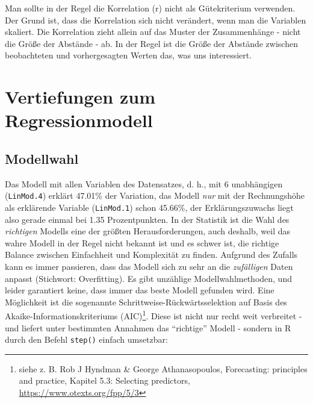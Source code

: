 \documentclass[12pt,]{book}
\let\BeginKnitrBlock\begin \let\EndKnitrBlock\end
\begin{document}
\BeginKnitrBlock{rmdcaution}
Man sollte in der Regel die Korrelation (r) nicht als Gütekriterium
verwenden. Der Grund ist, dass die Korrelation sich nicht verändert,
wenn man die Variablen skaliert. Die Korrelation zieht allein auf das
Muster der Zusammenhänge - nicht die Größe der Abstände - ab. In der
Regel ist die Größe der Abstände zwischen beobachteten und
vorhergesagten Werten das, was uns interessiert.
\EndKnitrBlock{rmdcaution}

\section{Vertiefungen zum
Regressionmodell}\label{vertiefungen-zum-regressionmodell}

\subsection{Modellwahl}\label{modellwahl}

Das Modell mit allen Variablen des Datensatzes, d. h., mit 6
unabhängigen (\texttt{LinMod.4}) erklärt 47.01\% der Variation, das
Modell \emph{nur} mit der Rechnungshöhe als erklärende Variable
(\texttt{LinMod.1}) schon 45.66\%, der Erklärungszuwachs liegt also
gerade einmal bei 1.35 Prozentpunkten. In der Statistik ist die Wahl des
\emph{richtigen} Modells eine der größten Herausforderungen, auch
deshalb, weil das wahre Modell in der Regel nicht bekannt ist und es
schwer ist, die richtige Balance zwischen Einfachheit und Komplexität zu
finden. Aufgrund des Zufalls kann es immer passieren, dass das Modell
sich zu sehr an die \emph{zufälligen} Daten anpasst (Stichwort:
Overfitting). Es gibt unzählige Modellwahlmethoden, und leider
garantiert keine, dass immer das beste Modell gefunden wird. Eine
Möglichkeit ist die sogenannte Schrittweise-Rückwärtsselektion auf Basis
des Akaike-Informationskriteriums (AIC)\footnote{siehe z. B. Rob J
  Hyndman \& George Athanasopoulos, Forecasting: principles and
  practice, Kapitel 5.3: Selecting predictors,
  \url{https://www.otexts.org/fpp/5/3}}. Diese ist nicht nur recht weit
verbreitet - und liefert unter bestimmten Annahmen das ``richtige''
Modell - sondern in R durch den Befehl \texttt{step()} einfach
umsetzbar:
\end{document}
